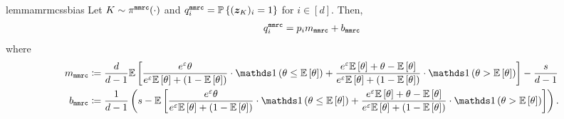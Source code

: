 \begin{restatable}{lemma}{mrmcssbias}\label{thm:mmrc_ss_bias_0}
Let $K \sim \pi^{\texttt{mmrc}}(\cdot)$ and $q^{\texttt{mmrc}}_i = \mathbb{P}\left\{({\boldsymbol{z}}_K)_i = 1\right\}$ for $i \in [d]$. Then, 
\begin{align}
    q^{\texttt{mmrc}}_i = p_i  m_\texttt{mmrc} + b_\texttt{mmrc}
\end{align}
where
\begin{align}
m_\texttt{mmrc} &\coloneqq \frac{d}{d-1} \E\lb \frac{e^\varepsilon\theta}{e^\varepsilon \E\lb\theta\rb + (1-\E \lb\theta\rb)}  \cdot \Indicator \lp\theta\leq \E\lb\theta\rb \rp  + \frac{e^\varepsilon \E \lb\theta\rb +\theta- \E \lb\theta\rb}{e^\varepsilon \E\lb\theta\rb + (1-\E \lb\theta\rb)}  \cdot \Indicator \lp\theta> \E\lb\theta\rb \rp \rb -\frac{s}{d-1} \label{eq:m_mmrc_ss}\\
b_\texttt{mmrc} &\coloneqq \frac{1}{d-1}\lp s - \E\lb \frac{e^\varepsilon\theta}{e^\varepsilon \E\lb\theta\rb + (1-\E \lb\theta\rb)}  \cdot \Indicator \lp\theta\leq \E\lb\theta\rb \rp  + \frac{e^\varepsilon \E \lb\theta\rb +\theta- \E \lb\theta\rb}{e^\varepsilon \E\lb\theta\rb + (1-\E \lb\theta\rb)}  \cdot \Indicator \lp\theta> \E\lb\theta\rb \rp \rb \rp. \label{eq:b_mmrc_ss}
\end{align}
\end{restatable}
